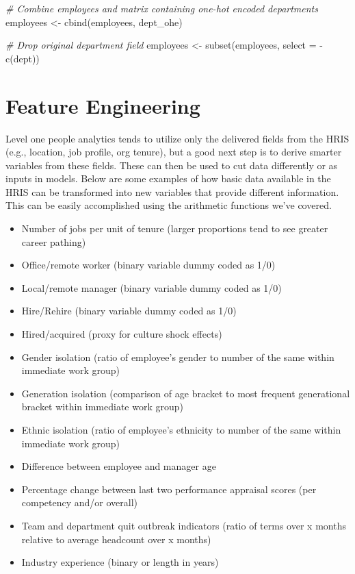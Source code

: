\documentclass[
]{book}
\newenvironment{Shaded}{\begin{snugshade}}{\end{snugshade}}
\newcommand{\AttributeTok}[1]{\textcolor[rgb]{0.77,0.63,0.00}{#1}}
\newcommand{\CommentTok}[1]{\textcolor[rgb]{0.56,0.35,0.01}{\textit{#1}}}
\newcommand{\FunctionTok}[1]{\textcolor[rgb]{0.00,0.00,0.00}{#1}}
\newcommand{\NormalTok}[1]{#1}
\newcommand{\OtherTok}[1]{\textcolor[rgb]{0.56,0.35,0.01}{#1}}
\newcommand{\SpecialCharTok}[1]{\textcolor[rgb]{0.00,0.00,0.00}{#1}}
\providecommand{\tightlist}{%
  \setlength{\itemsep}{0pt}\setlength{\parskip}{0pt}}
\begin{document}
\begin{Shaded}
\begin{Highlighting}[]
\CommentTok{\# Combine employees and matrix containing one{-}hot encoded departments}
\NormalTok{employees }\OtherTok{\textless{}{-}} \FunctionTok{cbind}\NormalTok{(employees, dept\_ohe)}

\CommentTok{\# Drop original department field}
\NormalTok{employees }\OtherTok{\textless{}{-}} \FunctionTok{subset}\NormalTok{(employees, }\AttributeTok{select =} \SpecialCharTok{{-}}\FunctionTok{c}\NormalTok{(dept))}
\end{Highlighting}
\end{Shaded}

\hypertarget{feature-engineering}{%
\section{Feature Engineering}\label{feature-engineering}}

Level one people analytics tends to utilize only the delivered fields from the HRIS (e.g., location, job profile, org tenure), but a good next step is to derive smarter variables from these fields. These can then be used to cut data differently or as inputs in models. Below are some examples of how basic data available in the HRIS can be transformed into new variables that provide different information. This can be easily accomplished using the arithmetic functions we've covered.

\begin{itemize}
\tightlist
\item
  Number of jobs per unit of tenure (larger proportions tend to see greater career pathing)
\item
  Office/remote worker (binary variable dummy coded as 1/0)
\item
  Local/remote manager (binary variable dummy coded as 1/0)
\item
  Hire/Rehire (binary variable dummy coded as 1/0)
\item
  Hired/acquired (proxy for culture shock effects)
\item
  Gender isolation (ratio of employee's gender to number of the same within immediate work
  group)
\item
  Generation isolation (comparison of age bracket to most frequent generational bracket within
  immediate work group)
\item
  Ethnic isolation (ratio of employee's ethnicity to number of the same within immediate work
  group)
\item
  Difference between employee and manager age
\item
  Percentage change between last two performance appraisal scores (per competency and/or
  overall)
\item
  Team and department quit outbreak indicators (ratio of terms over x months relative to average
  headcount over x months)
\item
  Industry experience (binary or length in years)
\end{itemize}
\end{document}
